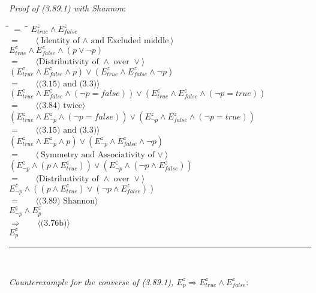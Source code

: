 \documentclass[12pt, fleqn, leqno]{article}
\newcommand{\lgap}{2pt}                             %
\newcommand{\mymathindent}{24pt}                    %
\newcommand{\impl}{\ensuremath{\Rightarrow}}        %
\newcommand{\myqed}{\rule[-.23ex]{1.2ex}{2.0ex}}
\newcommand{\myqedtab}{\hspace{384pt}}              %
\newcommand{\Gll} {\langle}                         %
\newcommand{\Ggg} {\rangle}                         %
\newcommand{\Hint}[1]     {\ \ \ $\Gll              \mbox{#1} \Ggg$ }   %
\begin{document}
\emph{Proof of (3.89.1) with Shannon}:
\begin{tabbing}
\hspace{\mymathindent} \= $= \;$ \= \myqedtab \= \kill
	\> \>  $E^{z}_{true}\land E^{z}_{false}$\\
	\> $=$  \>  \Hint{Identity of $\land$ and Excluded middle}\\[\lgap]
	\> \>   $E^{z}_{true}\land E^{z}_{false}\land(p\lor\lnot p)$\\
	\> $=$  \>  \Hint{Distributivity of $\land$ over $\lor$}\\[\lgap]
	\> \>   $(E^{z}_{true}\land E^{z}_{false}\land p)\lor(E^{z}_{true}\land E^{z}_{false}\land\lnot p)$\\
	\> $=$  \>  \Hint{(3.15) and (3.3)}\\[\lgap]
	\> \>   $(E^{z}_{true}\land E^{z}_{false}\land (\lnot p=false))\lor(E^{z}_{true}\land E^{z}_{false}\land (\lnot p=true))$\\
	\> $=$  \>  \Hint{(3.84) twice}\\[\lgap]
	\> \>   $(E^{z}_{true}\land E^{z}_{\lnot p}\land (\lnot p=false))\lor(E^{z}_{\lnot p}\land E^{z}_{false}\land (\lnot p=true))$\\
	\> $=$  \>  \Hint{(3.15) and (3.3)}\\[\lgap]
	\> \>   $(E^{z}_{true}\land E^{z}_{\lnot p}\land p)\lor(E^{z}_{\lnot p}\land E^{z}_{false}\land \lnot p)$\\
	\> $=$  \>  \Hint{Symmetry and Associativity of $\lor$}\\[\lgap]
	\> \>  $(E^{z}_{\lnot p}\land (p\land E^{z}_{true}))\lor(E^{z}_{\lnot p}\land (\lnot p\land E^{z}_{false}))$\\
	\> $=$  \>  \Hint{Distributivity of $\land$ over $\lor$}\\[\lgap]
	\> \>   $E^{z}_{\lnot p}\land ((p\land E^{z}_{true})\lor (\lnot p\land E^{z}_{false}))$\\
	\> $=$  \>  \Hint{(3.89) Shannon}\\[\lgap]
	\> \>   $E^{z}_{\lnot p}\land E^{z}_{p}$\\
	\> $\impl$  \>  \Hint{(3.76b)}\\[\lgap]
	\> \>   $E^{z}_{p}$ \quad \myqed\\
\end{tabbing}

\emph{Counterexample for the converse of (3.89.1), $E^{z}_{p} \impl E^{z}_{true}\land E^{z}_{false}$}:
\end{document}
